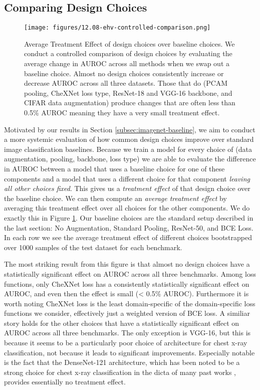 \subsection{Comparing Design Choices}
\label{subsec:controlled-comparison}
\begin{figure}
    \centering
    \texttt{[image: figures/12.08-ehv-controlled-comparison.png]}
    \caption{Average Treatment Effect of design choices over baseline choices. We conduct a controlled comparison of design choices by evaluating the average change in AUROC across all methods when we swap out a baseline choice. Almost no design choices consistently increase or decrease AUROC across all three datasets. Those that do (PCAM pooling, CheXNet loss type, ResNet-18 and VGG-16 backbone, and CIFAR data augmentation) produce changes that are often less than 0.5\% AUROC meaning they have a very small treatment effect. }
    \label{fig:controlled-comparison}
\end{figure}
Motivated by our results in Section \ref{subsec:imagenet-baseline}, we aim to conduct a more systemic evaluation of how common design choices improve over standard image classification baselines. Because we train a model for every choice of (data augmentation, pooling, backbone, loss type) we are able to evaluate the difference in AUROC between a model that uses a baseline choice for one of these components and a model that uses a different choice for that component \emph{leaving all other choices fixed}. This gives us a \emph{treatment effect} of that design choice over the baseline choice. We can then compute an \emph{average treatment effect} by averaging this treatment effect over all choices for the other components. We do exactly this in Figure \ref{fig:controlled-comparison}. Our baseline choices are the standard setup described in the last section: No Augmentation, Standard Pooling, ResNet-50, and BCE Loss. In each row we see the average treatment effect of different choices bootstrapped over 1000 samples of the test dataset for each benchmark.

The most striking result from this figure is that almost no design choices have a statistically significant effect on AUROC across all three benchmarks. Among loss functions, only CheXNet loss has a consistently statistically significant effect on AUROC, and even then the effect is small (< 0.5\% AUROC). Furthermore it is worth noting CheXNet loss is the least domain-specific of the domain-specific loss functions we consider, effectively just a weighted version of BCE loss. A similiar story holds for the other choices that have a statistically significant effect on AUROC across all three benchmarks. The only exception is VGG-16, but this is because it seems to be a particularly poor choice of architecture for chest x-ray classification, not because it leads to significant improvements. Especially notable is the fact that the DenseNet-121 architecture, which has been noted to be a strong choice for chest x-ray classification in the dicta of many past works \citep{irvin2019chexpert,pham2021interpreting,rajpurkar2017chexnet}, provides essentially no treatment effect. 

